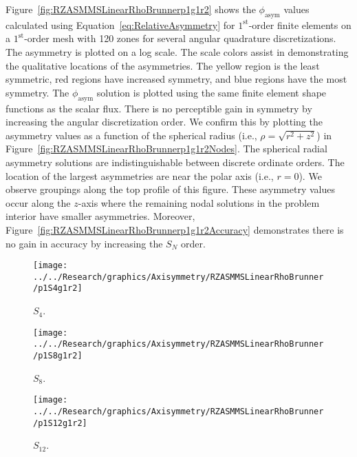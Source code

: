 \documentclass[12pt,letterpaper]{article}
\begin{document}
Figure~\ref{fig:RZASMMSLinearRhoBrunnerp1g1r2} shows the $\phi_\text{asym}$ values calculated using Equation~\ref{eq:RelativeAsymmetry} for $1^\text{st}$-order finite elements on a $1^\text{st}$-order mesh with 120 zones for several angular quadrature discretizations. The asymmetry is plotted on a log scale. The scale colors assist in demonstrating the qualitative locations of the asymmetries. The yellow region is the least symmetric, red regions have increased symmetry, and blue regions have the most symmetry. The $\phi_\text{asym}$ solution is plotted using the same finite element shape functions as the scalar flux. There is no perceptible gain in symmetry by increasing the angular discretization order. We confirm this by plotting the asymmetry values as a function of the spherical radius (i.e., $\rho=\sqrt{r^2+z^2}$) in Figure~\ref{fig:RZASMMSLinearRhoBrunnerp1g1r2Nodes}. The spherical radial asymmetry solutions are indistinguishable between discrete ordinate orders. The location of the largest asymmetries are near the polar axis (i.e., $r=0$). We observe groupings along the top profile of this figure. These asymmetry values occur along the $z$-axis where the remaining nodal solutions in the problem interior have smaller asymmetries. Moreover, Figure~\ref{fig:RZASMMSLinearRhoBrunnerp1g1r2Accuracy} demonstrates there is no gain in accuracy by increasing the $S_N$ order.

\begin{sidewaysfigure}[!htb]
\centering
\begin{subfigure}{0.33\textwidth}
\texttt{[image: ../../Research/graphics/Axisymmetry/RZASMMSLinearRhoBrunner/p1S4g1r2]}
\caption{$S_4$.}
\end{subfigure}%
\begin{subfigure}{0.33\textwidth}
\texttt{[image: ../../Research/graphics/Axisymmetry/RZASMMSLinearRhoBrunner/p1S8g1r2]}
\caption{$S_8$.}
\end{subfigure}%
\begin{subfigure}{0.33\textwidth}
\texttt{[image: ../../Research/graphics/Axisymmetry/RZASMMSLinearRhoBrunner/p1S12g1r2]}
\caption{$S_{12}$.}
\end{subfigure}
\caption{Relative asymmetry for $1^\text{st}$-order finite elements on a $1^\text{st}$-order mesh for given order of level-symmetric angular quadrature.}
\label{fig:RZASMMSLinearRhoBrunnerp1g1r2}
\end{sidewaysfigure}
\end{document}
